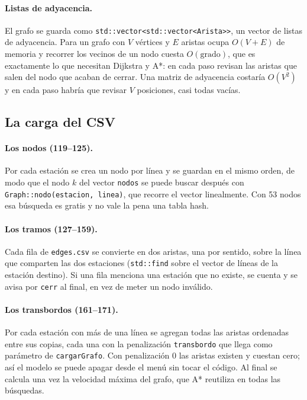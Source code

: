 \documentclass[11pt,a4paper]{article}
\newcommand{\arch}[1]{\texttt{#1}}
\begin{document}


\paragraph{Listas de adyacencia.}
El grafo se guarda como \arch{std::vector<std::vector<Arista>>}, un vector de
listas de adyacencia. Para un grafo con $V$ vértices y $E$ aristas ocupa
$O(V+E)$ de memoria y recorrer los vecinos de un nodo cuesta $O(\text{grado})$,
que es exactamente lo que necesitan Dijkstra y A*: en cada paso revisan las
aristas que salen del nodo que acaban de cerrar. Una matriz de adyacencia
costaría $O(V^2)$ y en cada paso habría que revisar $V$ posiciones, casi todas
vacías.

\subsection{La carga del CSV}



\paragraph{Los nodos (119--125).}
Por cada estación se crea un nodo por línea y se guardan en el mismo orden, de
modo que el nodo $k$ del vector \arch{nodos} se puede buscar después con
\arch{Graph::nodo(estacion, linea)}, que recorre el vector linealmente. Con 53
nodos esa búsqueda es gratis y no vale la pena una tabla hash.

\paragraph{Los tramos (127--159).}
Cada fila de \arch{edges.csv} se convierte en dos aristas, una por sentido, sobre
la línea que comparten las dos estaciones (\arch{std::find} sobre el vector de
líneas de la estación destino). Si una fila menciona una estación que no existe,
se cuenta y se avisa por \arch{cerr} al final, en vez de meter un nodo inválido.

\paragraph{Los transbordos (161--171).}
Por cada estación con más de una línea se agregan todas las aristas ordenadas
entre sus copias, cada una con la penalización \arch{transbordo} que llega como
parámetro de \arch{cargarGrafo}. Con penalización 0 las aristas existen y cuestan
cero; así el modelo se puede apagar desde el menú sin tocar el código. Al final se
calcula una vez la velocidad máxima del grafo, que A* reutiliza en todas las
búsquedas.
\end{document}
